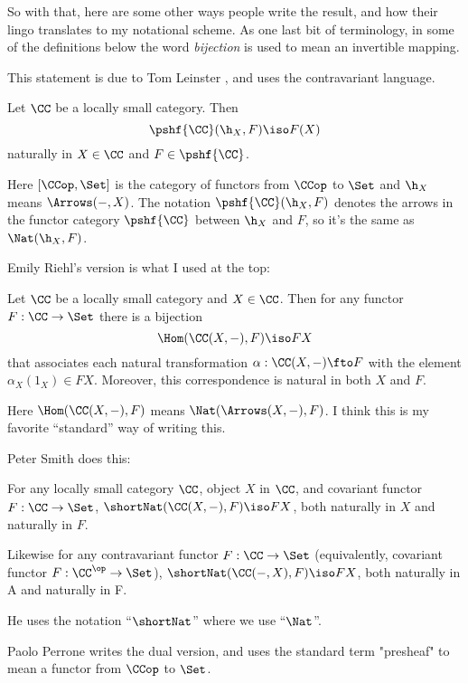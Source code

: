 So with that, here are some other ways people write the result, and how their lingo
translates to my notational scheme. As one last bit of terminology, in some of the
definitions below the word {\it bijection} is used to mean an invertible mapping.

\pg
This statement is due to Tom Leinster \cite{Leinster}, and uses the contravariant
language.

\begin{lemma}[Yoneda]   
\label{yoneda-leinster}
Let $\CC$ be a locally small category.  Then
%
$$
\pshf{\CC}(\h_X, F)
\iso
F(X)
$$
%
naturally in $X \in \CC$ and $F \in \pshf{\CC}$.  
\end{lemma}
\noindent
Here $[\CCop, \Set]$ is the category of functors from $\CCop$ to $\Set$ and 
$\h_X$ means $\Arrows(-,X)$.
The notation $\pshf{\CC}(\h_X, F)$ denotes the arrows in the functor
category $\pshf{\CC}$ between $\h_X$ and $F$, so it's the same as $\Nat(\h_X, F)$.

\pg
Emily Riehl's \cite{Riehl2016} version is what I used at the top:

\begin{lemma}[Yoneda]\label{yoneda-Riehl} Let $\CC$ be a locally small category and $X \in
\CC$. Then for any functor $F : \CC \to \Set$ there is a bijection
$$
\Hom(\CC(X,-), F) \iso FX
$$
that associates each natural transformation $\alpha:\CC(X,-) \fto F$ with the element
$\alpha_X(1_X) \in FX$. Moreover, this correspondence is natural in both $X$ and $F$.
\end{lemma}
\noindent
Here $\Hom(\CC(X,-), F)$ means $\Nat(\Arrows(X,-), F)$. I think this is my favorite
``standard'' way of writing this.

\pg
Peter Smith \cite{Smith} does this:

\begin{lemma}[Yoneda]\label{yoneda-smith} For any locally small category $\CC$, object $X$
in $\CC$, and covariant functor $F:\CC \to \Set$,  $\mathop{\shortNat}(\CC(X,-),F) \iso
FX$, both naturally in $X$ and naturally in $F$.

Likewise for any contravariant functor $F:\CC \to \Set$ (equivalently, covariant functor $F:\CC^\op \to \Set$),
$\mathop{\shortNat}(\CC(-,X),F) \iso FX$, both naturally in A and naturally in F.
\end{lemma}
\noindent
He uses the notation ``$\mathop{\shortNat}$''
where we use ``$\Nat$''.

\pg
Paolo Perrone \cite{Perrone} writes the dual version, and uses the standard term
"presheaf" to mean a functor from $\CCop$ to $\Set$.

